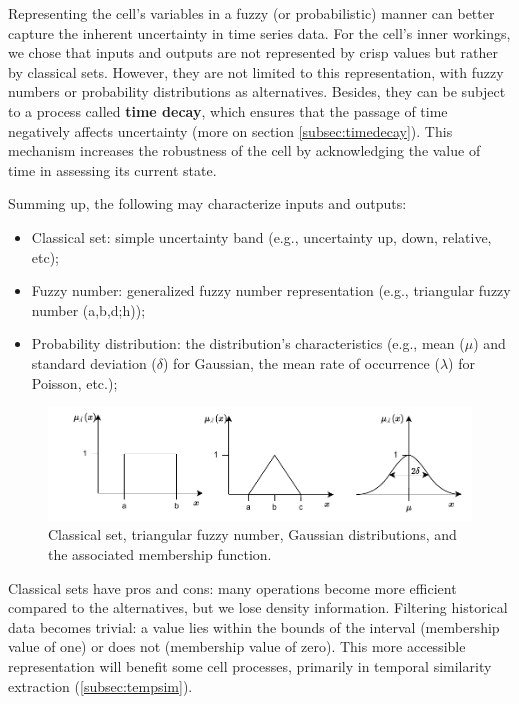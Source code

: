 Representing the cell's variables in a fuzzy (or probabilistic) manner can better capture the inherent uncertainty in time series data. For the cell's inner workings, we chose that inputs and outputs are not represented by crisp values but rather by classical sets. However, they are not limited to this representation, with fuzzy numbers or probability distributions as alternatives. Besides, they can be subject to a process called \textbf{time decay}, which ensures that the passage of time negatively affects uncertainty (more on section \ref{subsec:timedecay}). This mechanism increases the robustness of the cell by acknowledging the value of time in assessing its current state.

Summing up, the following may characterize inputs and outputs:

\begin{itemize}
    \item Classical set: simple uncertainty band (e.g., uncertainty up, down, relative, etc);
    \item Fuzzy number: generalized fuzzy number representation \cite{Zhang2019} (e.g., triangular fuzzy number (a,b,d;h));
    \item Probability distribution: the distribution's characteristics (e.g., mean ($\mu$) and standard deviation ($\delta$) for Gaussian, the mean rate of occurrence ($\lambda$) for Poisson, etc.);
\end{itemize}

\begin{figure}[h!]
    \centering
    \includegraphics[width=15cm]{figures/chapter4/cell/classic_fuzzy_gaussian.pdf}
    \caption{Classical set, triangular fuzzy number, Gaussian distributions, and the associated membership function.}
    \label{fig:classicfuzzygaussian}
\end{figure}

Classical sets have pros and cons: many operations become more efficient compared to the alternatives, but we lose density information. Filtering historical data becomes trivial: a value lies within the bounds of the interval (membership value of one) or does not (membership value of zero). This more accessible representation will benefit some cell processes, primarily in temporal similarity extraction (\ref{subsec:tempsim}).

